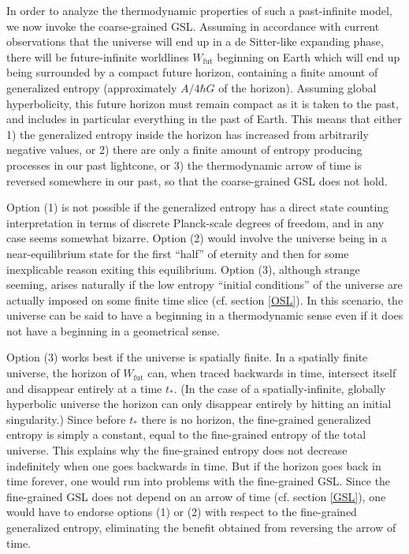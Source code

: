\documentclass[12pt]{article}
\begin{document}
In order to analyze the thermodynamic properties of such a past-infinite model, we now invoke the coarse-grained GSL.  Assuming in accordance with current observations that the universe will end up in a de Sitter-like expanding phase, there will be future-infinite worldlines $W_\mathrm{fut}$ beginning on Earth which will end up being surrounded by a compact future horizon, containing a finite amount of generalized entropy (approximately $A/4\hbar G$ of the horizon).  Assuming global hyperbolicity, this future horizon must remain compact as it is taken to the past, and includes in particular everything in the past of Earth.  This means that either 1) the generalized entropy inside the horizon has increased from arbitrarily negative values, or 2) there are only a finite amount of entropy producing processes in our past lightcone, or 3) the thermodynamic arrow of time is reversed somewhere in our past, so that the coarse-grained GSL does not hold.

Option (1) is not possible if the generalized entropy has a direct state counting interpretation in terms of discrete 
Planck-scale degrees of freedom, and in any case seems somewhat bizarre.  Option (2) would involve the universe being in a near-equilibrium state for the first ``half'' of eternity and then for some inexplicable reason exiting this equilibrium.  Option (3), although strange seeming, arises naturally if the low entropy ``initial conditions'' of the universe are actually imposed on some finite time slice (cf. section \ref{OSL}).  In this scenario, the universe can be said to have a beginning in a thermodynamic sense even if it does not have a beginning in a geometrical sense.

Option (3) works best if the universe is spatially finite.  In a spatially finite universe, the horizon of $W_\mathrm{fut}$ can, when traced backwards in time, intersect itself and disappear entirely at a time $t_*$.  (In the case of a spatially-infinite, globally hyperbolic universe the horizon can only disappear entirely by hitting an initial singularity.)  Since before $t_*$ there is no horizon, the fine-grained generalized entropy is simply a constant, equal to the fine-grained entropy of the total universe.  This explains why the fine-grained entropy does not decrease indefinitely when one goes backwards in time.  But if the horizon goes back in time forever, one would run into problems with the fine-grained GSL.  Since the fine-grained GSL does not depend on an arrow of time (cf. section \ref{GSL}), one would have to endorse options (1) or (2) with respect to the fine-grained generalized entropy, eliminating the benefit obtained from reversing the arrow of time.
\end{document}
